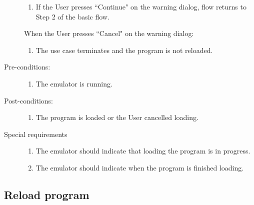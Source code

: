 \documentclass[12pt]{article}
\begin{document}
\begin{description}
\begin{enumerate}
			\item{If the User presses ``Continue" on the warning dialog, flow returns to Step 2 of the basic flow.}
		\end{enumerate}
	When the User presses ``Cancel" on the warning dialog:
        \begin{enumerate}
          \item{The use case terminates and the program is not reloaded.}
        \end{enumerate}
      \item[Pre-conditions:] \hfill
        \begin{enumerate}
          \item{The emulator is running.}
        \end{enumerate}
      \item[Post-conditions:] \hfill
        \begin{enumerate}
	  \item{The program is loaded or the User cancelled loading.}
        \end{enumerate}
      \item[Special requirements] \hfill
        \begin{enumerate}
          \item{The emulator should indicate that loading the program is in progress.}
          \item{The emulator should indicate when the program is finished loading.}
        \end{enumerate}
    \end{description}
  \subsection{Reload program}
\end{document}
